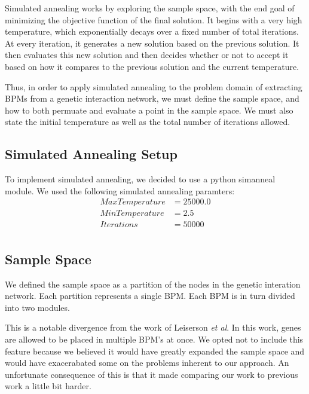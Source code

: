 \documentclass[11pt]{article}
\begin{document}
\par Simulated annealing works by exploring the sample space, with the end goal of minimizing the objective function of the final solution. It begins with a very high temperature, which exponentially decays over a fixed number of total iterations. At every iteration, it generates a new solution based on the previous solution. It then  evaluates this new solution and then decides whether or not to accept it based on how it compares to the previous solution and the current temperature.

\par Thus, in order to apply simulated annealing to the problem domain of extracting BPMs from a genetic interaction network, we must define the sample space, and how to both permuate and evaluate a point in the sample space. We must also state the initial temperature as well as the total number of iterations allowed.

\subsection{Simulated Annealing Setup}
\par To implement simulated annealing, we decided to use a python simanneal module. We used the following simulated annealing paramters:
\begin{align*}
Max Temperature &= 25000.0  \\
Min Temperature &= 2.5      \\
Iterations  &= 50000        \\
\end{align*}



\subsection{Sample Space}
\par We defined the sample space as a partition of the nodes in the genetic interation network. Each partition represents a single BPM. Each BPM is in turn divided into two modules.

\par This is a notable divergence from the work of Leiserson \textit{et al}. In this work, genes are allowed to be placed in multiple BPM's at once. We opted not to include this feature because we believed it would have greatly  expanded the sample space and would have exacerabated some on the problems inherent to our approach. An unfortunate consequence of this is that it made comparing our work to previous work a little bit harder. 
\end{document}
